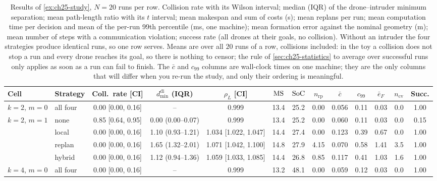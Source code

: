 \begin{table}[tb]
  \centering\scriptsize\setlength{\tabcolsep}{2pt}
  \caption{Results of \cref{ex:ch25-study}, $N = 20$ runs per row. Collision
  rate with its Wilson interval; median (IQR) of the drone--intruder minimum
  separation; mean path-length ratio with its $t$ interval; mean makespan
  and sum of costs (s); mean replans per run; mean computation time per
  decision and mean of the per-run 99th percentile (ms, one machine); mean
  formation error against the nominal
  geometry (m); mean number of steps with a communication violation;
  success rate (all drones at their goals, no collision). Without an
  intruder the four strategies produce identical runs, so one row serves.
  Means are over all $20$ runs of a row, collisions included: in the toy a
  collision does not stop a run and every drone reaches its goal, so there is
  nothing to censor; the rule of \cref{sec:ch25-statistics} to average over
  successful runs only applies as soon as a run can fail to finish.
  The $\bar c$ and $c_{99}$ columns are wall-clock times on one machine;
  they are the only columns that will differ when you re-run the study, and
  only their ordering is meaningful.}
  \label{tab:ch25-results}
  \begin{tabular}{@{}llccccccccccc@{}}
  \toprule
  Cell & Strategy & Coll.\ rate [CI] & $d_{\min}^{\mathrm{di}}$ (IQR) & $\rho_L$ [CI] & $\mathrm{MS}$ & $\mathrm{SoC}$ & $n_{\mathrm{rp}}$ & $\bar c$ & $c_{99}$ & $\bar e_F$ & $n_{\mathrm{cv}}$ & Succ.\\
  \midrule
  $k{=}2$, $m{=}0$ & all four & 0.00 [0.00, 0.16] & -- & 0.999 & 13.4 & 25.2 & 0.00 & 0.056 & 0.11 & 0.03 & 0.0 & 1.00\\
  \midrule
  $k{=}2$, $m{=}1$ & none   & 0.85 [0.64, 0.95] & 0.00 (0.00--0.07) & 0.999 & 13.4 & 25.2 & 0.00 & 0.060 & 0.11 & 0.03 & 0.0 & 0.15\\
                   & local  & 0.00 [0.00, 0.16] & 1.10 (0.93--1.21) & 1.034 [1.022, 1.047] & 14.4 & 27.4 & 0.00 & 0.123 & 0.39 & 0.67 & 0.0 & 1.00\\
                   & replan & 0.00 [0.00, 0.16] & 1.65 (1.32--2.01) & 1.071 [1.042, 1.100] & 14.8 & 27.9 & 4.15 & 0.070 & 0.58 & 1.41 & 3.5 & 1.00\\
                   & hybrid & 0.00 [0.00, 0.16] & 1.12 (0.94--1.36) & 1.059 [1.033, 1.085] & 14.4 & 26.8 & 0.85 & 0.117 & 0.41 & 1.03 & 1.6 & 1.00\\
  \midrule
  $k{=}4$, $m{=}0$ & all four & 0.00 [0.00, 0.16] & -- & 0.999 & 13.2 & 48.1 & 0.00 & 0.059 & 0.12 & 0.03 & 0.0 & 1.00\\

\end{tabular}
\end{table}

